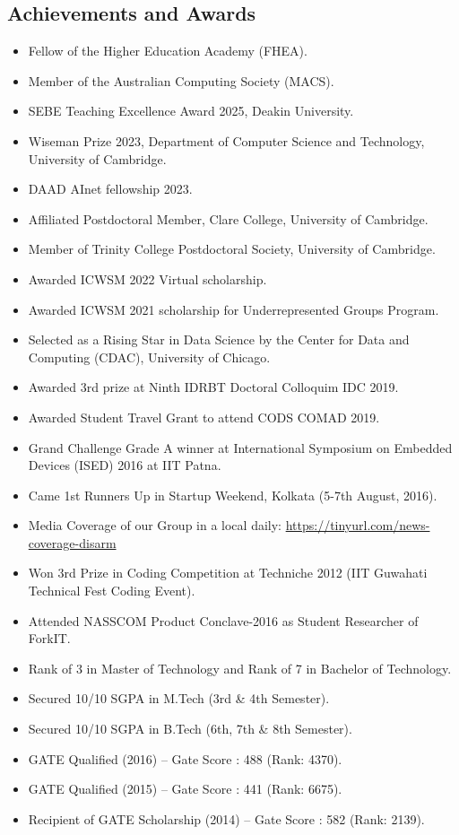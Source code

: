 \documentclass[margin, centered,lmodern]{res}
\begin{document}
\begin{resume}
\section{Achievements and Awards}
\begin{itemize}[leftmargin=*]
\item Fellow of the Higher Education Academy (FHEA).
\item Member of the Australian Computing Society (MACS).
\item SEBE Teaching Excellence Award 2025,  Deakin University.
\item Wiseman Prize 2023, Department of Computer Science and Technology, University of Cambridge.
\item DAAD AInet fellowship 2023.
\item Affiliated Postdoctoral Member, Clare College, University of Cambridge.
\item Member of Trinity College Postdoctoral Society,  University of Cambridge.
 \item Awarded ICWSM 2022 Virtual scholarship.
 \item Awarded ICWSM 2021 scholarship for Underrepresented Groups Program.
 \item Selected as a Rising Star in Data Science by the Center for Data and Computing (CDAC), University of Chicago.
 \item Awarded 3rd prize at Ninth IDRBT Doctoral Colloquim IDC 2019.
 \item Awarded Student Travel Grant to attend CODS COMAD 2019.
 \item Grand Challenge Grade A winner at International Symposium on Embedded Devices (ISED) 2016 at IIT Patna.
 \item Came 1st Runners Up in Startup Weekend, Kolkata (5-7th August, 2016).
 \item Media Coverage of our Group in a local daily: \url{https://tinyurl.com/news-coverage-disarm}
 \item Won 3rd Prize in Coding Competition at Techniche 2012 (IIT Guwahati Technical Fest Coding Event).
 \item Attended NASSCOM Product Conclave-2016 as Student Researcher of ForkIT.
 \item Rank of 3 in Master of Technology and Rank of 7 in Bachelor of Technology.
 \item Secured 10/10 SGPA in M.Tech (3rd \& 4th Semester).
 \item Secured 10/10 SGPA in B.Tech (6th, 7th \& 8th Semester).
 \item GATE Qualified (2016) – Gate Score : 488 (Rank: 4370).
 \item GATE Qualified (2015) – Gate Score : 441 (Rank: 6675).
 \item Recipient of GATE Scholarship (2014) – Gate Score : 582 (Rank: 2139).


\end{itemize}
\end{resume}
\end{document}
